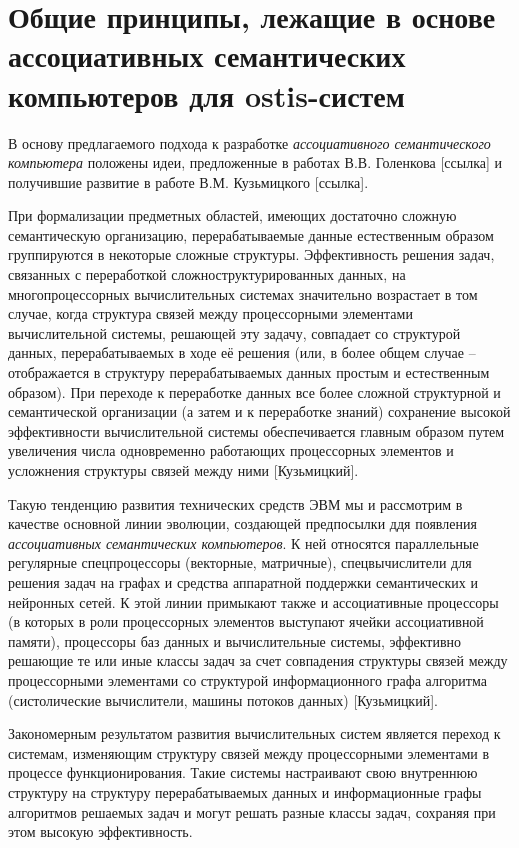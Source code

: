 \section{Общие принципы, лежащие в основе ассоциативных семантических компьютеров для ostis-систем}

В основу предлагаемого подхода к разработке \textit{ассоциативного семантического компьютера} положены идеи, предложенные в работах В.В. Голенкова [ссылка] и получившие развитие в работе В.М. Кузьмицкого [ссылка].

При формализации предметных областей, имеющих достаточно сложную семантическую организацию, перерабатываемые данные естественным образом группируются в некоторые сложные структуры. Эффективность решения задач, связанных с переработкой сложноструктурированных данных, на многопроцессорных вычислительных системах значительно возрастает в том случае, когда структура связей между процессорными элементами вычислительной системы, решающей эту задачу, совпадает со структурой данных, перерабатываемых в ходе её решения (или, в более общем случае -- отображается в структуру перерабатываемых данных простым и естественным образом). При переходе к переработке данных все более сложной структурной и семантической организации (а затем и к переработке знаний) сохранение высокой эффективности вычислительной системы обеспечивается главным образом путем увеличения числа одновременно работающих процессорных элементов и усложнения структуры связей между ними [Кузьмицкий].

Такую тенденцию развития технических средств ЭВМ мы и рассмотрим в качестве основной линии эволюции, создающей предпосылки ддя появления \textit{ассоциативных семантических компьютеров}. К ней относятся параллельные регулярные спецпроцессоры (векторные, матричные), спецвычислители для решения задач на графах и средства аппаратной поддержки семантических и нейронных сетей. К этой линии примыкают также и ассоциативные процессоры (в которых в роли процессорных элементов выступают ячейки ассоциативной памяти), процессоры баз данных и вычислительные системы, эффективно решающие те или иные классы задач за счет совпадения структуры связей между процессорными элементами со структурой информационного графа алгоритма (систолические вычислители, машины потоков данных) [Кузьмицкий].

Закономерным результатом развития вычислительных систем является переход к системам, изменяющим структуру связей между процессорными элементами в процессе функционирования. Такие системы настраивают свою внутреннюю структуру на структуру перерабатываемых данных и информационные графы алгоритмов решаемых задач и могут решать разные классы задач, сохраняя при этом высокую эффективность.

